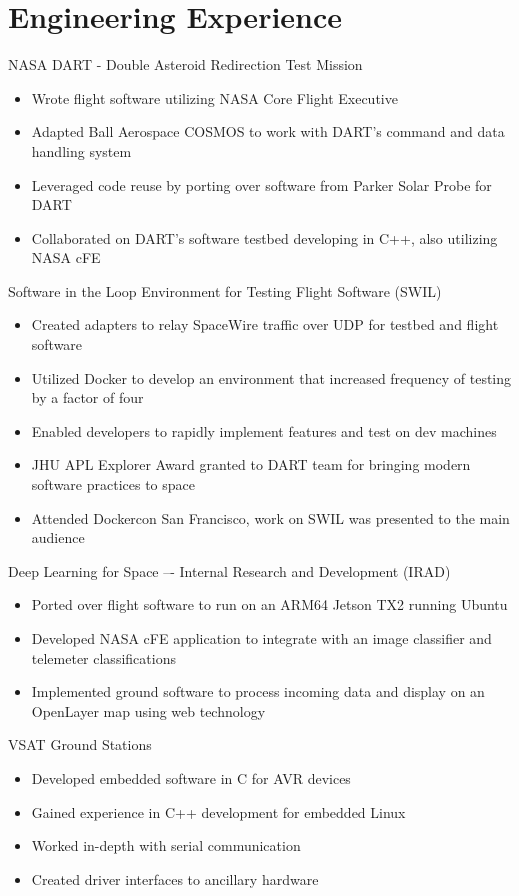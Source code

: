 \documentclass[10pt,final,sans]{resume}
\begin{document}
\section{Engineering Experience}

NASA DART - Double Asteroid Redirection Test Mission
\begin{itemize}
  \item Wrote flight software utilizing NASA Core Flight Executive
  \item Adapted Ball Aerospace COSMOS to work with DART's command and data handling system
  \item Leveraged code reuse by porting over software from Parker Solar Probe for DART
  \item Collaborated on DART's software testbed developing in C++, also utilizing NASA cFE
\end{itemize} 
Software in the Loop Environment for Testing Flight Software (SWIL)
\begin{itemize}
  \item Created adapters to relay SpaceWire traffic over UDP for testbed and flight software
  \item Utilized Docker to develop an environment that increased frequency of testing by a factor of four
  \item Enabled developers to rapidly implement features and test on dev machines
  \item JHU APL Explorer Award granted to DART team for bringing modern software practices to space
  \item Attended Dockercon San Francisco, work on SWIL was presented to the main audience
\end{itemize}
Deep Learning for Space –- Internal Research and Development (IRAD)
\begin{itemize}
  \item Ported over flight software to run on an ARM64 Jetson TX2 running Ubuntu
  \item Developed NASA cFE application to integrate with an image classifier and telemeter classifications
  \item Implemented ground software to process incoming data and display on an OpenLayer map using web technology
\end{itemize}
VSAT Ground Stations
\begin{itemize}
  \item Developed embedded software in C for AVR devices
  \item Gained experience in C++ development for embedded Linux
  \item Worked in-depth with serial communication
  \item Created driver interfaces to ancillary hardware
\end{itemize}
\end{document}
